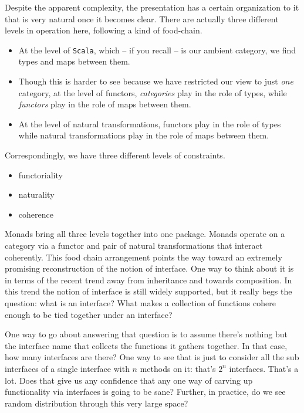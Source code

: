 Despite the apparent complexity, the presentation has a certain
organization to it that is very natural once it becomes clear. There
are actually three different levels in operation here, following a kind
of food-chain. 
\begin{itemize}
\item At the level of \texttt{Scala}, which -- if you recall
-- is our ambient category, we find types and maps between
them. 
\item Though this is harder to see because we have restricted our view
to just \emph{one} category, at the level of functors,
\emph{categories} play in the role of types, while \emph{functors}
play in the role of maps between them.
\item At the level of natural
transformations, functors play in the role of types while natural
transformations play in the role of maps between them.
\end{itemize}

Correspondingly, we have three different levels of constraints.
\begin{itemize}
  \item functoriality
  \item naturality
  \item coherence
\end{itemize}

Monads bring all three levels together into one package. Monads
operate on a category via a functor and pair of natural
transformations that interact coherently. This food chain arrangement
points the way toward an extremely promising reconstruction of the
notion of interface. One way to think about it is in terms of the
recent trend away from inheritance and towards composition. In this
trend the notion of interface is still widely supported, but it really
begs the question: what is an interface? What makes a collection of
functions cohere enough to be tied together under an interface?

One way to go about answering that question is to assume there's
nothing but the interface name that collects the functions it gathers
together. In that case, how many interfaces are there? One way to see
that is just to consider all the sub interfaces of a single interface
with $n$ methods on it: that's $2^n$ interfaces. That's a
lot. Does that give us any confidence that any one way of carving up
functionality via interfaces is going to be sane? Further, in
practice, do we see random distribution through this very large space?

